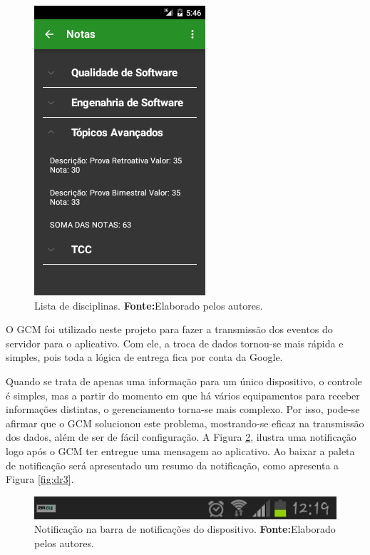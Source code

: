 \begin{figure}[h!]
    \centerline{\includegraphics[scale=0.8]{./imagens/3_discussao_resultados/dr1.png}}
    \caption[Lista de disciplinas]{Lista de disciplinas.
        \textbf{Fonte:}Elaborado pelos autores.}
    \label{fig:dr1}
\end{figure}

    \pagebreak

    \par O GCM foi utilizado neste projeto para fazer a transmissão dos eventos do
servidor para o aplicativo. Com ele, a troca de dados tornou-se mais rápida e
simples, pois toda a lógica de entrega fica por conta da Google.

    \par Quando se trata de apenas uma informação para um único dispositivo, o
controle é simples, mas a partir do momento em que há vários equipamentos para
receber informações distintas, o gerenciamento torna-se mais complexo. Por
isso, pode-se afirmar que o GCM solucionou este problema, mostrando-se eficaz
na transmissão dos dados, além de ser de fácil configuração. A Figura
\ref{fig:dr2}, ilustra uma notificação logo após o GCM ter entregue uma
mensagem ao aplicativo. Ao baixar a paleta de notificação será apresentado um
resumo da notificação, como apresenta a Figura \ref{fig:dr3}.


\begin{figure}[h!]
    \centerline{\includegraphics[scale=0.8]{./imagens/3_discussao_resultados/dr2.png}}
    \caption[Notificação na barra de notificações do dispositivo.]{Notificação na
    barra de notificações do dispositivo.
    \textbf{Fonte:}Elaborado pelos autores.}
    \label{fig:dr2}
\end{figure}


